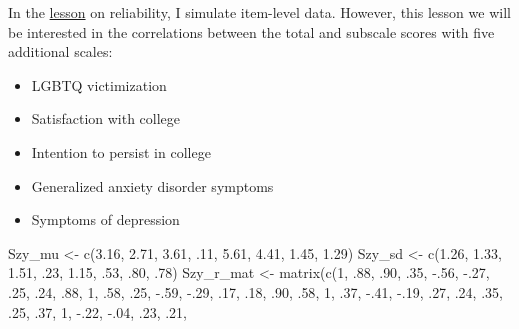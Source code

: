 \documentclass[
  english,
]{book}
\newenvironment{Shaded}{\begin{snugshade}}{\end{snugshade}}
\newcommand{\DecValTok}[1]{\textcolor[rgb]{0.00,0.00,0.81}{#1}}
\newcommand{\FloatTok}[1]{\textcolor[rgb]{0.00,0.00,0.81}{#1}}
\newcommand{\FunctionTok}[1]{\textcolor[rgb]{0.00,0.00,0.00}{#1}}
\newcommand{\NormalTok}[1]{#1}
\newcommand{\OtherTok}[1]{\textcolor[rgb]{0.56,0.35,0.01}{#1}}
\newcommand{\SpecialCharTok}[1]{\textcolor[rgb]{0.00,0.00,0.00}{#1}}
\providecommand{\tightlist}{%
  \setlength{\itemsep}{0pt}\setlength{\parskip}{0pt}}
\begin{document}
In the \protect\hyperlink{rxx}{lesson} on reliability, I simulate item-level data. However, this lesson we will be interested in the correlations between the total and subscale scores with five additional scales:

\begin{itemize}
\tightlist
\item
  LGBTQ victimization
\item
  Satisfaction with college
\item
  Intention to persist in college
\item
  Generalized anxiety disorder symptoms
\item
  Symptoms of depression
\end{itemize}

\begin{Shaded}
\begin{Highlighting}[]
\NormalTok{Szy\_mu }\OtherTok{\textless{}{-}} \FunctionTok{c}\NormalTok{(}\FloatTok{3.16}\NormalTok{, }\FloatTok{2.71}\NormalTok{, }\FloatTok{3.61}\NormalTok{, .}\DecValTok{11}\NormalTok{, }\FloatTok{5.61}\NormalTok{, }\FloatTok{4.41}\NormalTok{, }\FloatTok{1.45}\NormalTok{, }\FloatTok{1.29}\NormalTok{)}
\NormalTok{Szy\_sd }\OtherTok{\textless{}{-}} \FunctionTok{c}\NormalTok{(}\FloatTok{1.26}\NormalTok{, }\FloatTok{1.33}\NormalTok{, }\FloatTok{1.51}\NormalTok{, .}\DecValTok{23}\NormalTok{, }\FloatTok{1.15}\NormalTok{, .}\DecValTok{53}\NormalTok{, .}\DecValTok{80}\NormalTok{, .}\DecValTok{78}\NormalTok{)}
\NormalTok{Szy\_r\_mat }\OtherTok{\textless{}{-}} \FunctionTok{matrix}\NormalTok{(}\FunctionTok{c}\NormalTok{(}\DecValTok{1}\NormalTok{,   .}\DecValTok{88}\NormalTok{, .}\DecValTok{90}\NormalTok{, .}\DecValTok{35}\NormalTok{, }\SpecialCharTok{{-}}\NormalTok{.}\DecValTok{56}\NormalTok{, }\SpecialCharTok{{-}}\NormalTok{.}\DecValTok{27}\NormalTok{, .}\DecValTok{25}\NormalTok{, .}\DecValTok{24}\NormalTok{,}
\NormalTok{                  .}\DecValTok{88}\NormalTok{,  }\DecValTok{1}\NormalTok{,  .}\DecValTok{58}\NormalTok{, .}\DecValTok{25}\NormalTok{, }\SpecialCharTok{{-}}\NormalTok{.}\DecValTok{59}\NormalTok{, }\SpecialCharTok{{-}}\NormalTok{.}\DecValTok{29}\NormalTok{, .}\DecValTok{17}\NormalTok{, .}\DecValTok{18}\NormalTok{,}
\NormalTok{                  .}\DecValTok{90}\NormalTok{, .}\DecValTok{58}\NormalTok{,  }\DecValTok{1}\NormalTok{,  .}\DecValTok{37}\NormalTok{, }\SpecialCharTok{{-}}\NormalTok{.}\DecValTok{41}\NormalTok{, }\SpecialCharTok{{-}}\NormalTok{.}\DecValTok{19}\NormalTok{, .}\DecValTok{27}\NormalTok{, .}\DecValTok{24}\NormalTok{,}
\NormalTok{                  .}\DecValTok{35}\NormalTok{, .}\DecValTok{25}\NormalTok{, .}\DecValTok{37}\NormalTok{,  }\DecValTok{1}\NormalTok{,  }\SpecialCharTok{{-}}\NormalTok{.}\DecValTok{22}\NormalTok{, }\SpecialCharTok{{-}}\NormalTok{.}\DecValTok{04}\NormalTok{, .}\DecValTok{23}\NormalTok{, .}\DecValTok{21}\NormalTok{,}

\end{Highlighting}
\end{Shaded}
\end{document}
